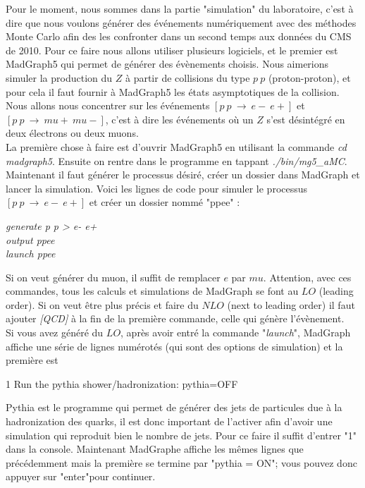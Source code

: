 \documentclass[a4paper]{report}
\begin{document}
Pour le moment, nous sommes dans la partie "simulation" du laboratoire, c'est à dire que nous voulons générer des événements numériquement avec des méthodes Monte Carlo afin des les confronter dans un second temps aux données du CMS de 2010. Pour ce faire nous allons utiliser plusieurs logiciels, et le premier est MadGraph5 qui permet de générer des évènements choisis. Nous aimerions simuler la production du $Z$ à partir de collisions du type $p \ p$ (proton-proton), et pour cela il faut fournir à MadGraph5 les états asymptotiques de la collision. Nous allons nous concentrer sur les événements $[p \ p \ \rightarrow \ e- \ e+]$ et $[p \ p \ \rightarrow \ mu+ \ mu-]$, c'est à dire les événements où un $Z$ s'est désintégré en deux électrons ou deux muons. \\

La première chose à faire est d'ouvrir MadGraph5 en utilisant la commande \textit{cd madgraph5}. Ensuite on rentre dans le programme en tappant \textit{./bin/mg5\_aMC}. Maintenant il faut générer le processus désiré, créer un dossier dans MadGraph et lancer la simulation. Voici les lignes de code pour simuler le processus $[p \ p \ \rightarrow \ e- \ e+]$ et créer un dossier nommé "ppee" : 
\w
\begin{flushleft}
\textit{generate p p > e- e+} \\
\textit{output ppee} \\
\textit{launch ppee} \\
\end{flushleft}

Si on veut générer du muon, il suffit de remplacer $e$ par $mu$. Attention, avec ces commandes, tous les calculs et simulations de MadGraph se font au $LO$ (leading order). Si on veut être plus précis et faire du $NLO$ (next to leading order) il faut ajouter \textit{[QCD]} à la fin de la première commande, celle qui génère l'évènement. \\

Si vous avez généré du $LO$, après avoir entré la commande "\textit{launch}", MadGraph affiche une série de lignes numérotés (qui sont des options de simulation) et la première est 
\begin{center}
1 Run the pythia shower/hadronization:         pythia=OFF
\end{center}

Pythia est le programme qui permet de générer des jets de particules due à la hadronization des quarks, il est donc important de l'activer afin d'avoir une simulation qui reproduit bien le nombre de jets. Pour ce faire il suffit d'entrer "1" dans la console. Maintenant MadGraphe affiche les mêmes lignes que précédemment mais la première se termine par "pythia = ON"; vous pouvez donc appuyer sur "enter"pour continuer.\\
\end{document}
